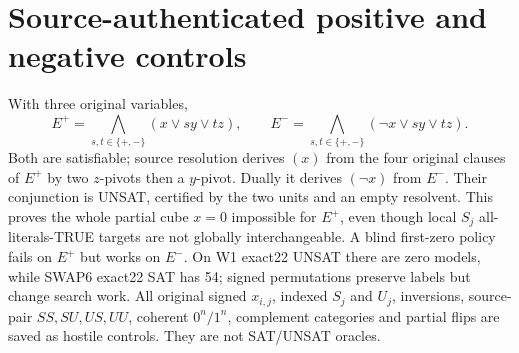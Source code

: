 \documentclass[11pt]{article}
\begin{document}
\section{Source-authenticated positive and negative controls}
With three original variables,
\[
 E^+=\bigwedge_{s,t\in\{+,-\}}(x\vee sy\vee tz),\qquad
 E^-=\bigwedge_{s,t\in\{+,-\}}(\neg x\vee sy\vee tz).
\]
Both are satisfiable; source resolution derives $(x)$ from the four original clauses of $E^+$ by two $z$-pivots then a $y$-pivot. Dually it derives $(\neg x)$ from $E^-$. Their conjunction is UNSAT, certified by the two units and an empty resolvent. This proves the whole partial cube $x=0$ impossible for $E^+$, even though local $S_j$ all-literals-TRUE targets are not globally interchangeable. A blind first-zero policy fails on $E^+$ but works on $E^-$. On W1 exact22 UNSAT there are zero models, while SWAP6 exact22 SAT has 54; signed permutations preserve labels but change search work. All original signed $x_{i,j}$, indexed $S_j$ and $U_j$, inversions, source-pair $SS,SU,US,UU$, coherent $0^n/1^n$, complement categories and partial flips are saved as hostile controls. They are not SAT/UNSAT oracles.
\end{document}
